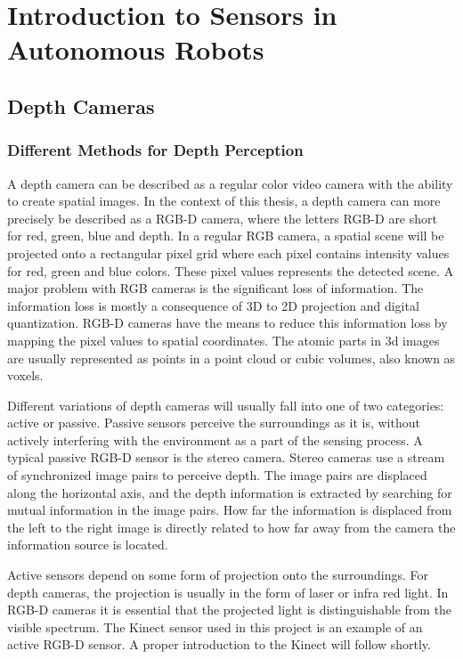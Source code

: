 \section{Introduction to Sensors in Autonomous Robots}

\subsection{Depth Cameras}

\subsubsection{Different Methods for Depth Perception}

A depth camera can be described as a regular color video camera with the ability to create spatial images. In the context of this thesis, a depth camera can  more precisely be described as a RGB-D camera, where the letters RGB-D are short for red, green, blue and depth. In a regular RGB camera, a spatial scene will be projected onto a rectangular pixel grid where each pixel contains intensity values for red, green and blue colors. These pixel values represents the detected scene. A major problem with RGB cameras is the significant loss of information. The information loss is mostly a consequence of 3D to 2D projection and digital quantization. RGB-D cameras have the means to reduce this information loss by mapping the pixel values to spatial coordinates. The atomic parts in 3d images are usually represented as points in a point cloud or cubic volumes, also known as voxels.

Different variations of depth cameras will usually fall into one of two categories: active or passive. Passive sensors perceive the surroundings as it is, without actively interfering with the environment as a part of the sensing process. A typical passive RGB-D sensor is the stereo camera. Stereo cameras use a stream of synchronized image pairs to perceive depth. The image pairs are displaced along the horizontal axis, and the depth information is extracted by searching for mutual information in the image pairs. How far the information is displaced from the left to the right image is directly related to how far away from the camera the information source is located. 

Active sensors depend on some form of projection onto the surroundings. For depth cameras, the projection is usually in the form of laser or infra red light. In RGB-D cameras it is essential that the projected light is distinguishable from the visible spectrum. The Kinect sensor used in this project is an example of an active RGB-D sensor. A proper introduction to the Kinect will follow shortly.

